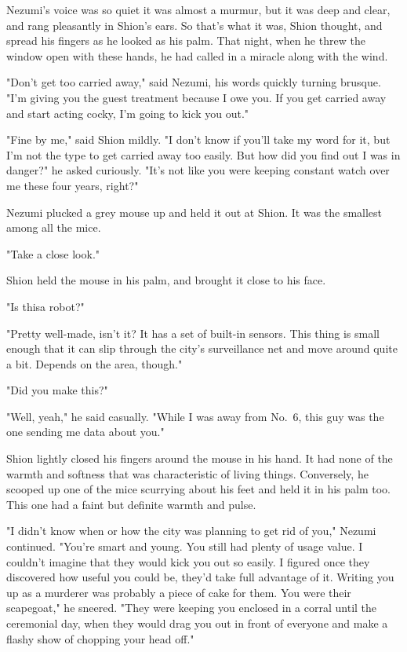Nezumi's voice was so quiet it was almost a murmur, but it was deep and
clear, and rang pleasantly in Shion's ears. So that's what it was, Shion
thought, and spread his fingers as he looked as his palm. That night,
when he threw the window open with these hands, he had called in a
miracle along with the wind.

"Don't get too carried away," said Nezumi, his words quickly turning
brusque. "I'm giving you the guest treatment because I owe you. If you
get carried away and start acting cocky, I'm going to kick you out."

"Fine by me," said Shion mildly. "I don't know if you'll take my word
for it, but I'm not the type to get carried away too easily. But how did
you find out I was in danger?" he asked curiously. "It's not like you
were keeping constant watch over me these four years, right?"

Nezumi plucked a grey mouse up and held it out at Shion. It was the
smallest among all the mice.

"Take a close look."

Shion held the mouse in his palm, and brought it close to his face.

"Is this\el a robot?"

"Pretty well-made, isn't it? It has a set of built-in sensors. This
thing is small enough that it can slip through the city's surveillance
net and move around quite a bit. Depends on the area, though."

"Did you make this?"

"Well, yeah," he said casually. "While I was away from No.~6, this guy
was the one sending me data about you."

Shion lightly closed his fingers around the mouse in his hand. It had
none of the warmth and softness that was characteristic of living
things. Conversely, he scooped up one of the mice scurrying about his
feet and held it in his palm too. This one had a faint but definite
warmth and pulse.

"I didn't know when or how the city was planning to get rid of you,"
Nezumi continued. "You're smart and young. You still had plenty of usage
value. I couldn't imagine that they would kick you out so easily. I
figured once they discovered how useful you could be, they'd take full
advantage of it. Writing you up as a murderer was probably a piece of
cake for them. You were their scapegoat," he sneered. "They were keeping
you enclosed in a corral until the ceremonial day, when they would drag
you out in front of everyone and make a flashy show of chopping your
head off."

